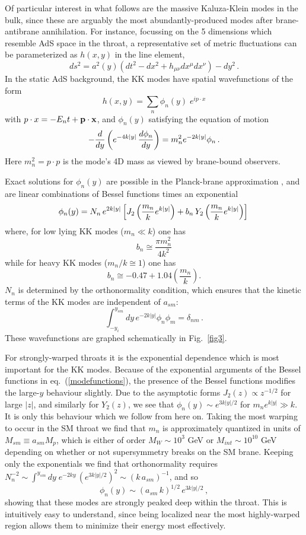 \documentclass[12pt]{JHEP3}
\def\beq{\begin{equation}}
\def\eeq{\end{equation}}
\begin{document}
Of particular interest in what follows are the massive
Kaluza-Klein modes in the bulk, since these are arguably the most
abundantly-produced modes after brane-antibrane annihilation. For
instance, focussing on the 5 dimensions which resemble AdS space
in the throat, a representative set of metric fluctuations can be
parameterized as $h(x,y)$ in the line element,
%
\beq \label{RSh}
    ds^2 = a^2(y)(dt^2 - dx^2 + h_{\mu\nu} dx^\mu dx^\nu) - dy^2
    \,.
\eeq
%
In the static AdS background, the KK modes have spatial
wavefunctions of the form
%
\beq
    h(x,y) = \sum_n\phi_n(y) \; e^{ip\cdot x}
\eeq
%
with $p\cdot x = - E_n t + {\bf p} \cdot {\bf x}$, and $\phi_n(y)$
satisfying the equation of motion
%
\beq
    -{d\over dy}\left(e^{-4k|y|} \,{d\phi_n\over dy}\right)
    = m^2_n e^{-2k|y|}\phi_n \,.
\eeq
%
Here $m_n^2 = p \cdot p$ is the mode's 4D mass as viewed by
brane-bound observers.

Exact solutions for $\phi_n(y)$ are possible in the Planck-brane
approximation \cite{RS,dkkls,PlanckBraneModes}, and are linear
combinations of Bessel functions times an exponential
%
\beq \label{modefunctions}
    \phi_n(y) = N_n \, e^{2k|y|}
    \left[ J_2\left({m_n\over k}e^{k|y|}\right)
    + {b_n} \,
    Y_2\left({m_n\over k}e^{k|y|}\right) \right]
 \,
\eeq
%
where, for low lying KK modes ($m_n \ll k$) one has
%
\beq
    b_n \cong \frac{\pi m_n^2}{4 k^2}
\eeq
%
while for heavy KK modes ($m_n / k \cong 1$) one has
%
\beq
    b_n \cong -0.47 + 1.04 \left( \frac{m_n}{k} \right).
\eeq
%
$N_n$ is determined by the orthonormality condition, which ensures
that the kinetic terms of the KK modes are independent of
$a_{sm}$:
%
\beq
    \int_{-y_i}^{y_{sm}} dy\, e^{-2k|y|} \phi_n \phi_m =
    \delta_{nm}\,.
\eeq
%
These wavefunctions are graphed schematically in Fig.~\ref{fig3}.

For strongly-warped throats it is the exponential dependence which
is most important for the KK modes. Because of the exponential
arguments of the Bessel functions in eq.~(\ref{modefunctions}),
the presence of the Bessel functions modifies the large-$y$
behaviour slightly. Due to the asymptotic forms $J_2(z) \propto
z^{-1/2}$ for large $|z|$, and similarly for $Y_2(z)$, we
see that $\phi_n(y) \sim e^{3k|y|/2}$ for $m_n e^{k|y|} \gg k$. It
is only this behaviour which we follow from here on. Taking the
most warping to occur in the SM throat we find that $m_n$ is
approximately quantized in units of $M_{sm} \equiv a_{sm} M_p$,
which is either of order $M_W \sim 10^3$ GeV or $M_{int} \sim
10^{10}$ GeV depending on whether or not supersymmetry breaks on
the SM brane. Keeping only the exponentials we find that
orthonormality requires $N_n^{-2} \sim \int^{y_{sm}} dy \;
e^{-2ky} \, \left( e^{3k |y|/2} \right)^2 \sim (k \,
a_{sm})^{-1}$, and so
%
\beq
\label{lownwf}
    \phi_n(y) \sim  ({a_{sm}\, k})^{1/2}\, e^{3k|y|/2} \,,
\eeq
%
showing that these modes are strongly peaked deep within the
throat. This is intuitively easy to understand, since being
localized near the most highly-warped region allows them to
minimize their energy most effectively.
\end{document}
